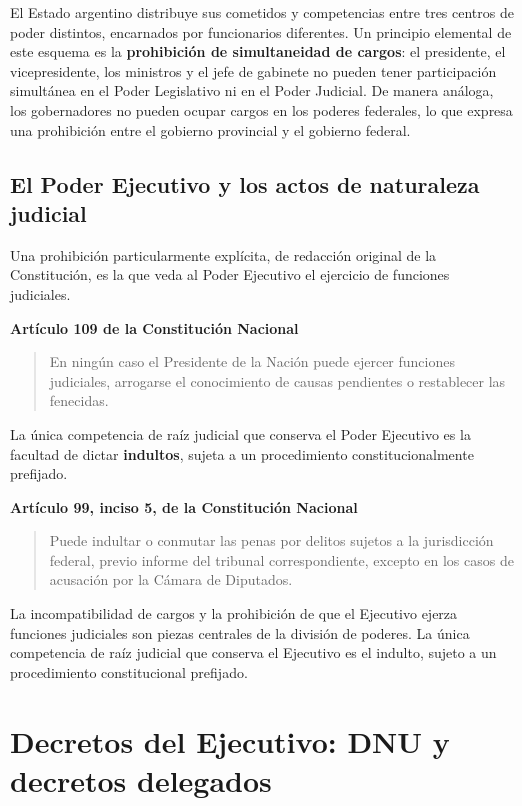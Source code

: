 \documentclass[12pt,oneside]{book}
\newenvironment{normacitada}[1]{%
    \medskip
    \noindent\textbf{#1}\par\smallskip
    \begin{quote}\itshape
}{%
    \end{quote}
    \medskip
}
\begin{document}
El Estado argentino distribuye sus cometidos y competencias entre tres centros de poder distintos, encarnados por funcionarios diferentes. Un principio elemental de este esquema es la \textbf{prohibición de simultaneidad de cargos}: el presidente, el vicepresidente, los ministros y el jefe de gabinete no pueden tener participación simultánea en el Poder Legislativo ni en el Poder Judicial. De manera análoga, los gobernadores no pueden ocupar cargos en los poderes federales, lo que expresa una prohibición entre el gobierno provincial y el gobierno federal.

\subsection{El Poder Ejecutivo y los actos de naturaleza judicial}

Una prohibición particularmente explícita, de redacción original de la Constitución, es la que veda al Poder Ejecutivo el ejercicio de funciones judiciales.

\begin{normacitada}{Artículo 109 de la Constitución Nacional}
En ningún caso el Presidente de la Nación puede ejercer funciones judiciales, arrogarse el conocimiento de causas pendientes o restablecer las fenecidas.
\end{normacitada}

La única competencia de raíz judicial que conserva el Poder Ejecutivo es la facultad de dictar \textbf{indultos}, sujeta a un procedimiento constitucionalmente prefijado.

\begin{normacitada}{Artículo 99, inciso 5, de la Constitución Nacional}
Puede indultar o conmutar las penas por delitos sujetos a la jurisdicción federal, previo informe del tribunal correspondiente, excepto en los casos de acusación por la Cámara de Diputados.
\end{normacitada}

\begin{important}
La incompatibilidad de cargos y la prohibición de que el Ejecutivo ejerza funciones judiciales son piezas centrales de la división de poderes. La única competencia de raíz judicial que conserva el Ejecutivo es el indulto, sujeto a un procedimiento constitucional prefijado.
\end{important}

\section{Decretos del Ejecutivo: DNU y decretos delegados}
\end{document}
